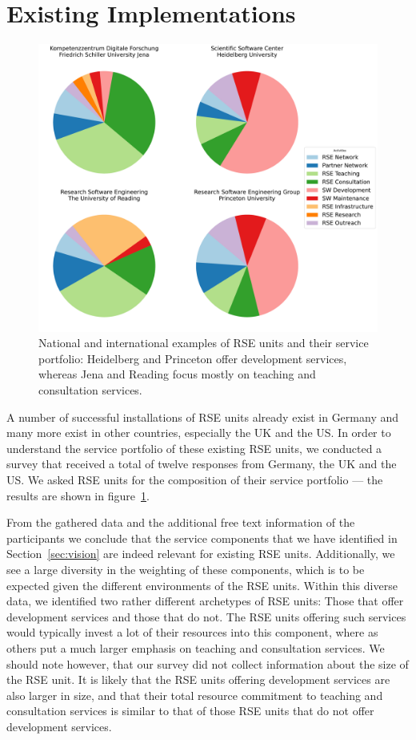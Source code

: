 \documentclass[a4paper]{article}
\begin{document}
\section{Existing Implementations}

\begin{figure}
\centering
\includegraphics[width=\textwidth]{./group_composition_plot/group_composition_plot_the_fantastic_four.pdf}
\caption{National and international examples of RSE units and their service portfolio: Heidelberg and Princeton offer development services, whereas Jena and Reading focus mostly on teaching and consultation services.}%
\label{fig:survey}
\end{figure}

A number of successful installations of RSE units already exist in Germany and many more exist in other countries, especially the UK and the US\@.
In order to understand the service portfolio of these existing RSE units, we conducted a survey that received a total of twelve responses from Germany, the UK and the US\@.
We asked RSE units for the composition of their service portfolio --- the results are shown in figure~\ref{fig:survey}.

From the gathered data and the additional free text information of the participants we conclude that the service components that we have identified in Section~\ref{sec:vision} are indeed relevant for existing RSE units.
Additionally, we see a large diversity in the weighting of these components, which is to be expected given the different environments of the RSE units.
Within this diverse data, we identified two rather different archetypes of RSE units: Those that offer development services and those that do not.
The RSE units offering such services would typically invest a lot of their resources into this component, where as others put a much larger emphasis on teaching and consultation services.
We should note however, that our survey did not collect information about the size of the RSE unit.
It is likely that the RSE units offering development services are also larger in size,
and that their total resource commitment to teaching and consultation services is similar to that of those RSE units that do not offer development services.
\end{document}
